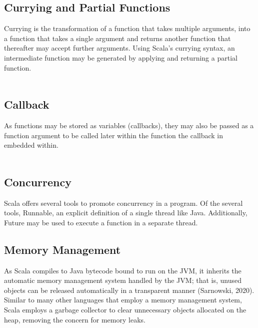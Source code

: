 \documentclass[12pt]{report}
\begin{document}
\subsection*{Currying and Partial Functions} 
Currying is the transformation of a function that takes multiple arguments, into a function that takes a single argument and returns another function that thereafter may accept further arguments. Using Scala’s currying syntax, an intermediate function may be generated by applying and returning a partial function. \\
\\  

\subsection*{Callback} 
As functions may be stored as variables (callbacks), they may also be passed as a function argument to be called later within the function the callback in embedded within. \\
\\ 

\subsection*{Concurrency} 
Scala offers several tools to promote concurrency in a program. Of the several tools, Runnable, an explicit definition of a single thread like Java. Additionally, Future may be used to execute a function in a separate thread. 

\subsection*{Memory Management}
As Scala compiles to Java bytecode bound to run on the JVM, it inherits the automatic memory management system handled by the JVM; that is, unused objects can be released automatically in a transparent manner (Sarnowski, 2020). Similar to many other languages that employ a memory management system, Scala employs a garbage collector to clear unnecessary objects allocated on the heap, removing the concern for memory leaks. 
\end{document}

